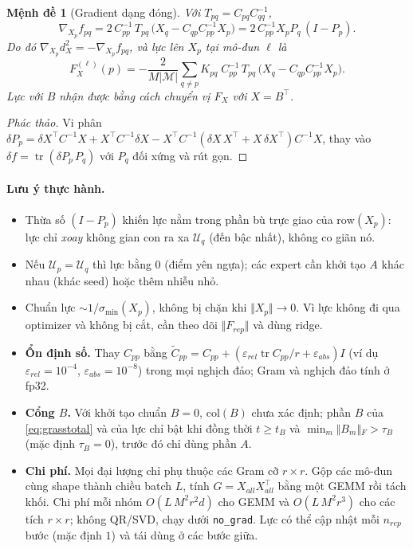 \documentclass[12pt,a4paper]{article}
\theoremstyle{plain}
\newtheorem{proposition}{Mệnh đề}
\begin{document}
\begin{proposition}[Gradient dạng đóng]
\label{prop:closedform}
Với $T_{pq}=C_{pq}C_{qq}^{-1}$,
\begin{equation}
\label{eq:gradf}
\nabla_{X_p}f_{pq}=2\,C_{pp}^{-1}\,T_{pq}\,\big(X_q-C_{qp}C_{pp}^{-1}X_p\big)=2\,C_{pp}^{-1}X_pP_q\,(I-P_p).
\end{equation}
Do đó $\nabla_{X_p}d_X^2=-\nabla_{X_p}f_{pq}$, và lực lên $X_p$ tại mô-đun $\ell$ là
\begin{equation}
\label{eq:forceclosed}
F^{(\ell)}_{X}(p)=-\frac{2}{M|\mathcal M|}\sum_{q\ne p}K_{pq}\;C_{pp}^{-1}\,T_{pq}\,\big(X_q-C_{qp}C_{pp}^{-1}X_p\big).
\end{equation}
Lực với $B$ nhận được bằng cách chuyển vị $F_X$ với $X=B^\top$.
\end{proposition}
\begin{proof}[Phác thảo]
Vi phân $\delta P_p=\delta X^\top C^{-1}X+X^\top C^{-1}\delta X-X^\top C^{-1}(\delta X\,X^\top+X\,\delta X^\top)C^{-1}X$, thay vào $\delta f=\operatorname{tr}(\delta P_p\,P_q)$ với $P_q$ đối xứng và rút gọn.
\end{proof}

\paragraph{Lưu ý thực hành.}
\begin{itemize}
\item Thừa số $(I-P_p)$ khiến lực nằm trong phần bù trực giao của $\mathrm{row}(X_p)$: lực chỉ \emph{xoay} không gian con ra xa $\mathcal U_q$ (đến bậc nhất), không co giãn nó.
\item Nếu $\mathcal U_p=\mathcal U_q$ thì lực bằng $0$ (điểm yên ngựa); các expert cần khởi tạo $A$ khác nhau (khác seed) hoặc thêm nhiễu nhỏ.
\item Chuẩn lực $\sim1/\sigma_{\min}(X_p)$, không bị chặn khi $\Vert{}X_p\Vert{}\to0$. Vì lực không đi qua optimizer và không bị cắt, cần theo dõi $\Vert{}F_{rep}\Vert{}$ và dùng ridge.
\item \textbf{Ổn định số.} Thay $C_{pp}$ bằng $\tilde C_{pp}=C_{pp}+(\varepsilon_{rel}\operatorname{tr}C_{pp}/r+\varepsilon_{abs})I$ (ví dụ $\varepsilon_{rel}=10^{-4}$, $\varepsilon_{abs}=10^{-8}$) trong mọi nghịch đảo; Gram và nghịch đảo tính ở fp32.
\item \textbf{Cổng $B$.} Với khởi tạo chuẩn $B=0$, $\mathrm{col}(B)$ chưa xác định; phần $B$ của \eqref{eq:grasstotal} và của lực chỉ bật khi đồng thời $t\ge t_B$ và $\min_m\Vert{}B_m\Vert{}_F>\tau_B$ (mặc định $\tau_B=0$), trước đó chỉ dùng phần $A$.
\item \textbf{Chi phí.} Mọi đại lượng chỉ phụ thuộc các Gram cỡ $r\times r$. Gộp các mô-đun cùng shape thành chiều batch $L$, tính $G=X_{all}X_{all}^\top$ bằng một GEMM rồi tách khối. Chi phí mỗi nhóm $O(L\,M^2r^2d)$ cho GEMM và $O(L\,M^2r^3)$ cho các tích $r\times r$; không QR/SVD, chạy dưới \texttt{no\_grad}. Lực có thể cập nhật mỗi $n_{rep}$ bước (mặc định $1$) và tái dùng ở các bước giữa.
\end{itemize}
\end{document}
